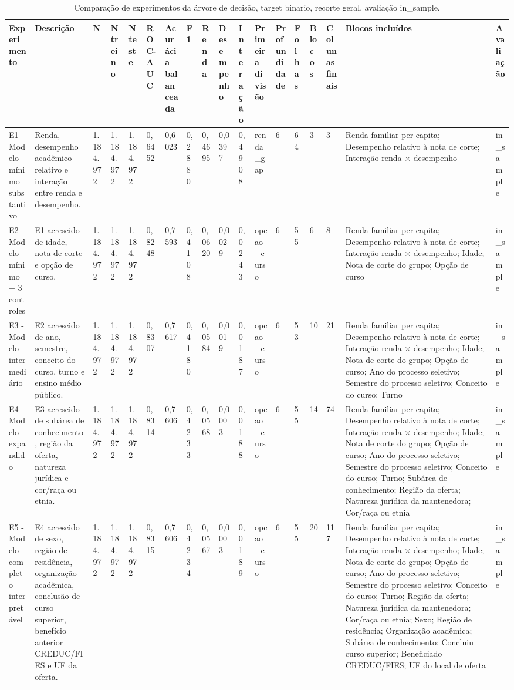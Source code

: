 \begin{table}
\caption{Comparação de experimentos da árvore de decisão, target binario, recorte geral, avaliação in_sample.}
\label{tab:tabela_treeClassification_binario_recorte_geral_in_sample}
\begin{tabular}{llllllllllllllllll}
\toprule
Experimento & Descrição & N & N treino & N teste & ROC-AUC & Acurácia balanceada & F1 & Renda & Desempenho & Interação & Primeira divisão & Profundidade & Folhas & Blocos & Colunas finais & Blocos incluídos & Avaliação \\
\midrule
E1 - Modelo mínimo substantivo & Renda, desempenho acadêmico relativo e interação entre renda e desempenho. & 1.184.972 & 1.184.972 & 1.184.972 & 0,6452 & 0,6023 & 0,2880 & 0,4695 & 0,0397 & 0,4908 & renda\_gap & 6 & 64 & 3 & 3 & Renda familiar per capita; Desempenho relativo à nota de corte; Interação renda × desempenho & in\_sample \\
E2 - Modelo mínimo + 3 controles & E1 acrescido de idade, nota de corte e opção de curso. & 1.184.972 & 1.184.972 & 1.184.972 & 0,8248 & 0,7593 & 0,4108 & 0,0620 & 0,0029 & 0,0243 & opcao\_curso & 6 & 55 & 6 & 8 & Renda familiar per capita; Desempenho relativo à nota de corte; Interação renda × desempenho; Idade; Nota de corte do grupo; Opção de curso & in\_sample \\
E3 - Modelo intermediário & E2 acrescido de ano, semestre, conceito do curso, turno e ensino médio público. & 1.184.972 & 1.184.972 & 1.184.972 & 0,8307 & 0,7617 & 0,4180 & 0,0584 & 0,0019 & 0,0187 & opcao\_curso & 6 & 53 & 10 & 21 & Renda familiar per capita; Desempenho relativo à nota de corte; Interação renda × desempenho; Idade; Nota de corte do grupo; Opção de curso; Ano do processo seletivo; Semestre do processo seletivo; Conceito do curso; Turno & in\_sample \\
E4 - Modelo expandido & E3 acrescido de subárea de conhecimento, região da oferta, natureza jurídica e cor/raça ou etnia. & 1.184.972 & 1.184.972 & 1.184.972 & 0,8314 & 0,7606 & 0,4233 & 0,0568 & 0,0003 & 0,0188 & opcao\_curso & 6 & 55 & 14 & 74 & Renda familiar per capita; Desempenho relativo à nota de corte; Interação renda × desempenho; Idade; Nota de corte do grupo; Opção de curso; Ano do processo seletivo; Semestre do processo seletivo; Conceito do curso; Turno; Subárea de conhecimento; Região da oferta; Natureza jurídica da mantenedora; Cor/raça ou etnia & in\_sample \\
E5 - Modelo completo interpretável & E4 acrescido de sexo, região de residência, organização acadêmica, conclusão de curso superior, benefício anterior CREDUC/FIES e UF da oferta. & 1.184.972 & 1.184.972 & 1.184.972 & 0,8315 & 0,7606 & 0,4234 & 0,0567 & 0,0003 & 0,0189 & opcao\_curso & 6 & 55 & 20 & 117 & Renda familiar per capita; Desempenho relativo à nota de corte; Interação renda × desempenho; Idade; Nota de corte do grupo; Opção de curso; Ano do processo seletivo; Semestre do processo seletivo; Conceito do curso; Turno; Região da oferta; Natureza jurídica da mantenedora; Cor/raça ou etnia; Sexo; Região de residência; Organização acadêmica; Subárea de conhecimento; Concluiu curso superior; Beneficiado CREDUC/FIES; UF do local de oferta & in\_sample \\

\end{tabular}
\end{table}
